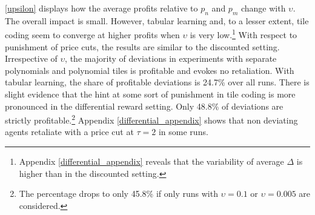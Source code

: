 \autoref{upsilon} displays how the average profits relative to $p_n$ and $p_m$ change with $\upsilon$. The overall impact is small. However, tabular learning and, to a lesser extent, tile coding seem to converge at higher profits when $\upsilon$ is very low.\footnote{Appendix \ref{differential_appendix} reveals that the variability of average $\Delta$ is higher than in the discounted setting.} With respect to punishment of price cuts, the results are similar to the discounted setting. Irrespective of $\upsilon$, the majority of deviations in experiments with separate polynomials and polynomial tiles is profitable and evokes no retaliation. With tabular learning, the share of profitable deviations is 24.7\% over all runs. There is slight evidence that the hint at some sort of punishment in tile coding is more pronounced in the differential reward setting. Only 48.8\% of deviations are strictly profitable.\footnote{The percentage drops to only 45.8\% if only runs with $\upsilon = 0.1$ or $\upsilon = 0.005$ are considered.} Appendix \ref{differential_appendix} shows that non deviating agents retaliate with a price cut at $\tau = 2$ in some runs.